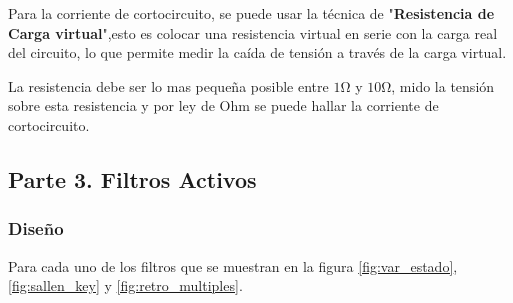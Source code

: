 \begin{enumerate}[label=\textbf{\arabic*.}, font=\bfseries]
\begin{itemize}
                Para la corriente de cortocircuito, se puede usar la técnica de "\textbf{Resistencia de Carga virtual}",esto es colocar una resistencia virtual en serie con la carga real del circuito, lo que permite medir la caída de tensión a través de la carga virtual.

                La resistencia debe ser lo mas pequeña posible entre $1\si{\ohm}$ y $10\si{\ohm}$, mido la tensión sobre esta resistencia  y por ley de Ohm se puede hallar la corriente de cortocircuito.
        \end{itemize}  
\end{enumerate}

\newpage
\subsection{Parte 3. Filtros Activos}
    \subsubsection{Diseño}
    Para cada uno de los filtros que se muestran en la figura \ref{fig:var_estado}, \ref{fig:sallen_key} y \ref{fig:retro_multiples}.

